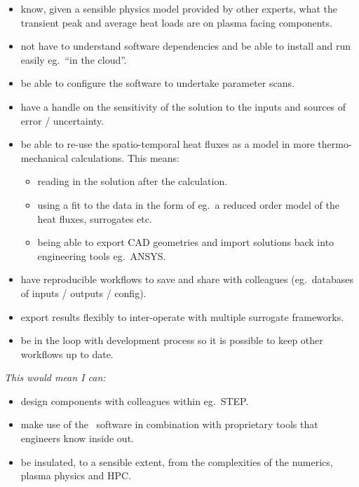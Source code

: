 \begin{itemize}
\item know, given a sensible physics model provided by other experts, what
  the transient peak and average heat loads are on plasma facing
  components.
\item not have to understand software dependencies and be able to install and
  run easily eg.\ ``in the cloud''.
\item be able to configure the software to undertake parameter scans.
\item have a handle on the sensitivity of the solution to the inputs and
  sources of error / uncertainty.
\item be able to re-use the spatio-temporal heat fluxes as a model in more
  thermo-mechanical calculations. This means:

  \begin{itemize}
  \item reading in the solution after the calculation.
  \item using a fit to the data in the form of eg.\ a reduced order model of
    the heat fluxes, surrogates etc.
  \item being able to export CAD geometries and import solutions back into
    engineering tools eg.\ ANSYS.
  \end{itemize}
\item have reproducible workflows to save and share with colleagues
  (eg.\ databases of inputs / outputs / config).
\item export results flexibly to inter-operate with multiple surrogate
  frameworks.
\item be in the loop with development process so it is possible to keep other
  workflows up to date.
\end{itemize}

\emph{This would mean I can:}

\begin{itemize}
\item design components with colleagues within eg.\ STEP.
\item make use of the \nep\ software in combination with proprietary tools that engineers
  know inside out.
\item be insulated, to a sensible extent, from the complexities of the
  numerics, plasma physics and HPC.
\end{itemize}
